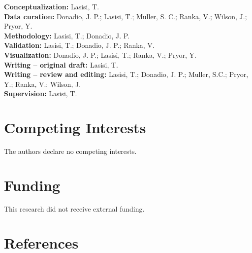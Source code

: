 \documentclass[11pt]{article}
\begin{document}
\textbf{Conceptualization:} Lasisi, T. \\
\textbf{Data curation:} Donadio, J. P.; Lasisi, T.; Muller, S. C.; Ranka, V.; Wilson, J.; Pryor, Y. \\
\textbf{Methodology:} Lasisi, T.; Donadio, J. P. \\
\textbf{Validation:} Lasisi, T.; Donadio, J. P.; Ranka, V. \\
\textbf{Visualization:} Donadio, J. P.; Lasisi, T.; Ranka, V.; Pryor, Y. \\
\textbf{Writing -- original draft:} Lasisi, T. \\
\textbf{Writing -- review and editing:} Lasisi, T.; Donadio, J. P.; Muller, S.C.; Pryor, Y.; Ranka, V.; Wilson, J. \\
\textbf{Supervision:} Lasisi, T.

\section*{Competing Interests}

The authors declare no competing interests.

\section*{Funding}

This research did not receive external funding.

\section*{References}
\end{document}
